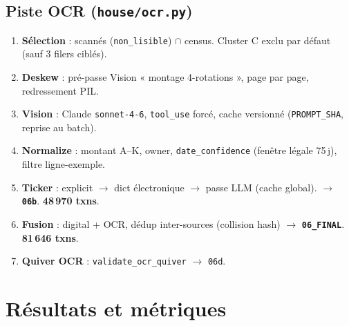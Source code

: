 \documentclass[11pt,a4paper]{article}
\begin{document}
\subsection{Piste OCR (\texttt{house/ocr.py})}
\begin{enumerate}[nosep,leftmargin=1.5em]
\item \textbf{Sélection} : scannés (\texttt{non\_lisible}) $\cap$ census. Cluster C exclu par défaut (sauf 3 filers ciblés).
\item \textbf{Deskew} : pré-passe Vision « montage 4-rotations », page par page, redressement PIL.
\item \textbf{Vision} : Claude \texttt{sonnet-4-6}, \texttt{tool\_use} forcé, cache versionné (\texttt{PROMPT\_SHA}, reprise au batch).
\item \textbf{Normalize} : montant A--K, owner, \texttt{date\_confidence} (fenêtre légale 75\,j), filtre ligne-exemple.
\item \textbf{Ticker} : explicit $\rightarrow$ dict électronique $\rightarrow$ passe LLM (cache global). $\rightarrow$ \textbf{\texttt{06b}}. \textbf{48\,970 txns}.
\item \textbf{Fusion} : digital + OCR, dédup inter-sources (collision hash) $\rightarrow$ \textbf{\texttt{06\_FINAL}}. \textbf{81\,646 txns}.
\item \textbf{Quiver OCR} : \texttt{validate\_ocr\_quiver} $\rightarrow$ \texttt{06d}.
\end{enumerate}

\section{Résultats et métriques}
\end{document}
